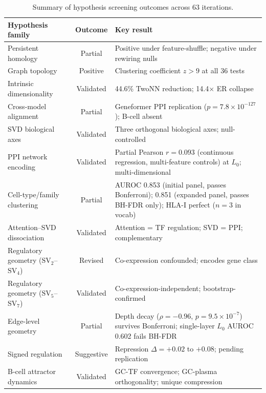 \documentclass[12pt]{article}
\newcommand{\SV}[1]{\mathrm{SV}_{#1}}
\begin{document}
\begin{table}[!ht]
\centering
\caption{Summary of hypothesis screening outcomes across 63 iterations.}
\label{tab:hypothesis_summary}
\small
\begin{tabular}{p{4.5cm}cp{6.5cm}}
\toprule
Hypothesis family & Outcome & Key result \\
\midrule
Persistent homology & Partial & Positive under feature-shuffle; negative under rewiring nulls \\
Graph topology & Positive & Clustering coefficient $z > 9$ at all 36 tests \\
Intrinsic dimensionality & Validated & 44.6\% TwoNN reduction; 14.4$\times$ ER collapse \\
Cross-model alignment & Partial & Geneformer PPI replication ($p = 7.8 \times 10^{-127}$); B-cell absent \\
SVD biological axes & Validated & Three orthogonal biological axes; null-controlled \\
PPI network encoding & Validated & Partial Pearson $r = 0.093$ (continuous regression, multi-feature controls) at $L_0$; multi-dimensional \\
Cell-type/family clustering & Partial & AUROC 0.853 (initial panel, passes Bonferroni); 0.851 (expanded panel, passes BH-FDR only); HLA-I perfect ($n = 3$ in vocab) \\
Attention--SVD dissociation & Validated & Attention = TF regulation; SVD = PPI; complementary \\
Regulatory geometry ($\SV{2}$--$\SV{4}$) & Revised & Co-expression confounded; encodes gene class \\
Regulatory geometry ($\SV{5}$--$\SV{7}$) & Validated & Co-expression-independent; bootstrap-confirmed \\
Edge-level geometry & Partial & Depth decay ($\rho = -0.96$, $p = 9.5\times 10^{-7}$) survives Bonferroni; single-layer $L_0$ AUROC 0.602 fails BH-FDR \\
Signed regulation & Suggestive & Repression $\Delta = +0.02$ to $+0.08$; pending replication \\
B-cell attractor dynamics & Validated & GC-TF convergence; GC-plasma orthogonality; unique compression \\
\bottomrule
\end{tabular}
\end{table}
\end{document}
